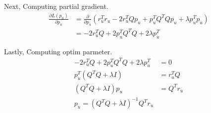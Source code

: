 \documentclass{article}
\begin{document}
Next, Computing partial gradient.
\begin{align*}
\frac{\partial L(p_u)}{\partial p_u} &= \frac{\partial}{\partial p_u} (r_u^T r_u - 2r_u^T Qp_u + p_u^T Q^T Qp_u + \lambda p_u^T p_u) \\
       &= -2r_u^T Q + 2p_u^T Q^T Q + 2\lambda p_u^T
\end{align*}

Lastly, Computing optim parmeter.
\begin{align*}
-2r_u^T Q + 2p_u^T Q^T Q + 2\lambda p_u^T &= 0 \\
p_u^T (Q^T Q + \lambda I) &= r_u^T Q \\
(Q^T Q + \lambda I)p_u &= Q^T r_u \\[5pt]
p_u = (Q^T Q + \lambda I)^{-1}Q^T r_u
\end{align*}
\end{document}
